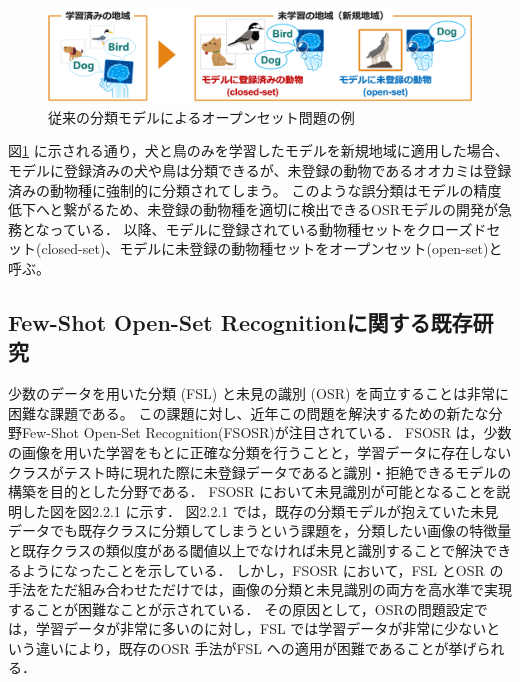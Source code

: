 \documentclass[a4paper,11pt,nomag]{jsreport}
\begin{document}
\begin{figure}[tbp]
  \centering
  \includegraphics[width=\linewidth, keepaspectratio]{image/non_osr.png}
  \caption{従来の分類モデルによるオープンセット問題の例}
  \label{fig:non_osr}
\end{figure}

図\ref{fig:non_osr} に示される通り，犬と鳥のみを学習したモデルを新規地域に適用した場合、モデルに登録済みの犬や鳥は分類できるが、未登録の動物であるオオカミは登録済みの動物種に強制的に分類されてしまう。
このような誤分類はモデルの精度低下へと繋がるため、未登録の動物種を適切に検出できるOSRモデルの開発が急務となっている．
以降、モデルに登録されている動物種セットをクローズドセット(closed-set)、モデルに未登録の動物種セットをオープンセット(open-set)と呼ぶ。


\subsection{Few-Shot Open-Set Recognitionに関する既存研究}

少数のデータを用いた分類 (FSL) と未見の識別 (OSR) を両立することは非常に困難な課題である。
この課題に対し、近年この問題を解決するための新たな分野Few-Shot Open-Set Recognition(FSOSR)が注目されている．
FSOSR は，少数の画像を用いた学習をもとに正確な分類を行うことと，学習データに存在しないクラスがテスト時に現れた際に未登録データであると識別・拒絶できるモデルの構築を目的とした分野である．
FSOSR において未見識別が可能となることを説明した図を図2.2.1 に示す．
図2.2.1 では，既存の分類モデルが抱えていた未見データでも既存クラスに分類してしまうという課題を，分類したい画像の特徴量と既存クラスの類似度がある閾値以上でなければ未見と識別することで解決できるようになったことを示している．
しかし，FSOSR において，FSL とOSR の手法をただ組み合わせただけでは，画像の分類と未見識別の両方を高水準で実現することが困難なことが示されている\cite{peeler}．
その原因として，OSRの問題設定では，学習データが非常に多いのに対し，FSL では学習データが非常に少ないという違いにより，既存のOSR 手法がFSL への適用が困難であることが挙げられる．
\end{document}

